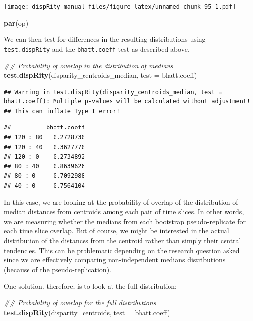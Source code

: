 \documentclass[]{book}
\newenvironment{Shaded}{\begin{snugshade}}{\end{snugshade}}
\newcommand{\CommentTok}[1]{\textcolor[rgb]{0.56,0.35,0.01}{\textit{#1}}}
\newcommand{\DataTypeTok}[1]{\textcolor[rgb]{0.13,0.29,0.53}{#1}}
\newcommand{\KeywordTok}[1]{\textcolor[rgb]{0.13,0.29,0.53}{\textbf{#1}}}
\newcommand{\NormalTok}[1]{#1}
\begin{document}
\texttt{[image: dispRity\_manual\_files/figure-latex/unnamed-chunk-95-1.pdf]}

\begin{Shaded}
\begin{Highlighting}[]
\KeywordTok{par}\NormalTok{(op)}
\end{Highlighting}
\end{Shaded}

We can then test for differences in the resulting distributions using \texttt{test.dispRity} and the \texttt{bhatt.coeff} test as described above.

\begin{Shaded}
\begin{Highlighting}[]
\CommentTok{## Probability of overlap in the distribution of medians}
\KeywordTok{test.dispRity}\NormalTok{(disparity_centroids_median, }\DataTypeTok{test =}\NormalTok{ bhatt.coeff)}
\end{Highlighting}
\end{Shaded}

\begin{verbatim}
## Warning in test.dispRity(disparity_centroids_median, test = bhatt.coeff): Multiple p-values will be calculated without adjustment!
## This can inflate Type I error!
\end{verbatim}

\begin{verbatim}
##          bhatt.coeff
## 120 : 80   0.2728730
## 120 : 40   0.3627770
## 120 : 0    0.2734892
## 80 : 40    0.8639626
## 80 : 0     0.7092988
## 40 : 0     0.7564104
\end{verbatim}

In this case, we are looking at the probability of overlap of the distribution of median distances from centroids among each pair of time slices.
In other words, we are measuring whether the medians from each bootstrap pseudo-replicate for each time slice overlap.
But of course, we might be interested in the actual distribution of the distances from the centroid rather than simply their central tendencies.
This can be problematic depending on the research question asked since we are effectively comparing non-independent medians distributions (because of the pseudo-replication).

One solution, therefore, is to look at the full distribution:

\begin{Shaded}
\begin{Highlighting}[]
\CommentTok{## Probability of overlap for the full distributions}
\KeywordTok{test.dispRity}\NormalTok{(disparity_centroids, }\DataTypeTok{test =}\NormalTok{ bhatt.coeff)}
\end{Highlighting}
\end{Shaded}
\end{document}
